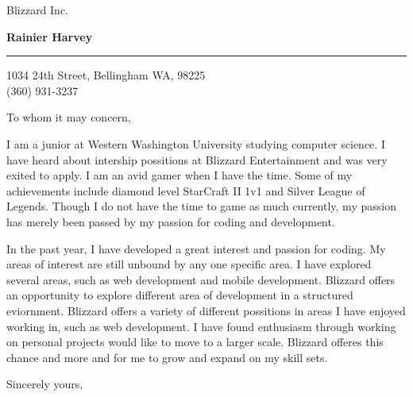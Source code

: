 \documentclass{letter} %
\begin{document}
\signature{%
Rainier Harvey}           %
\longindentation=0pt                       %
\let\raggedleft\raggedright                %
 
 
\begin{letter}{Blizzard Inc. \\}


\begin{flushleft}
{\large\bf Rainier Harvey}
\end{flushleft}
\medskip\hrule height 1pt
\begin{flushright}
\hfill 1034 24th Street, Bellingham WA, 98225\\
\hfill (360) 931-3237 
\end{flushright} 
\vfill %

 
\opening{To whom it may concern,} 
 
\noindent I am a junior at Western Washington University studying computer science. I have heard about intership possitions at Blizzard Entertainment and was very exited to apply. 
I am an avid gamer when I have the time. Some of my achievements include diamond level StarCraft II 1v1 and Silver League of Legends. Though I do not have the time to game as much currently, 
my passion has merely been passed by my passion for coding and development.
 
\noindent In the past year, I have developed a great interest and passion for coding. My areas of interest are still unbound by any one specific area. I have explored several areas, 
such as web development and mobile development. Blizzard offers an opportunity to explore different area of development in a structured eviornment. 
Blizzard offers a variety of different possitions in areas I have enjoyed working in, such as web development. I have found enthusiasm through working on personal projects would like to 
move to a larger scale. Blizzard offeres this chance and more and for me to grow and expand on my skill sets.
 
\closing{Sincerely yours,} 

 
\end{letter}
 
\end{document}
